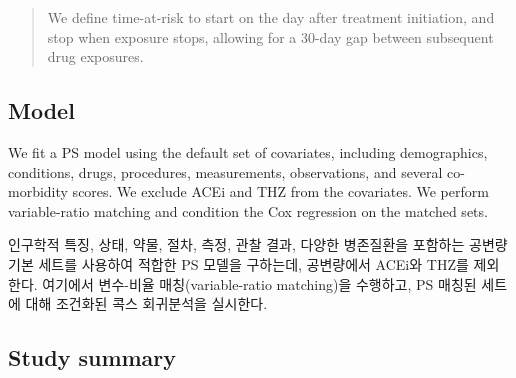 \documentclass[]{book}
\begin{document}
\begin{quote}
We define time-at-risk to start on the day after treatment initiation, and stop when exposure stops, allowing for a 30-day gap between subsequent drug exposures.
\end{quote}

\hypertarget{model}{%
\subsection{Model}\label{model}}

We fit a PS model using the default set of covariates, including demographics, conditions, drugs, procedures, measurements, observations, and several co-morbidity scores. We exclude ACEi and THZ from the covariates. We perform variable-ratio matching and condition the Cox regression on the matched sets.

인구학적 특징, 상태, 약물, 절차, 측정, 관찰 결과, 다양한 병존질환을 포함하는 공변량 기본 세트를 사용하여 적합한 PS 모델을 구하는데, 공변량에서 ACEi와 THZ를 제외한다. 여기에서 변수-비율 매칭(variable-ratio matching)을 수행하고, PS 매칭된 세트에 대해 조건화된 콕스 회귀분석을 실시한다.

\hypertarget{study-summary}{%
\subsection{Study summary}\label{study-summary}}
\end{document}
